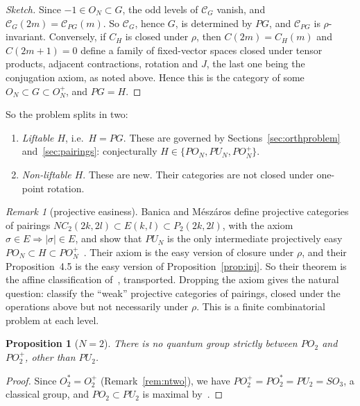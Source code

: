 \documentclass[11pt]{amsart}
\newtheorem{proposition}[theorem]{Proposition}
\theoremstyle{definition}
\theoremstyle{remark}
\newtheorem{remark}[theorem]{Remark}
\theoremstyle{plain}
\numberwithin{equation}{section}
\numberwithin{table}{section}
\begin{document}
\begin{proof}[Sketch]
Since $-1\in O_N\subset G$, the odd levels of $\mathcal C_G$ vanish, and $\mathcal C_G(2m)=\mathcal C_{PG}(m)$. So $\mathcal C_G$, hence $G$, is determined by
$PG$, and $\mathcal C_{PG}$ is $\rho$-invariant. Conversely, if $C_H$ is closed under $\rho$, then $C(2m)=C_H(m)$ and $C(2m+1)=0$
define a family of fixed-vector spaces closed under tensor products, adjacent contractions, rotation and $J$, the last
one being the conjugation axiom, as noted above. Hence this is the category of some $O_N\subset G\subset O_N^+$, and $PG=H$.
\end{proof}

So the problem splits in two:
\begin{enumerate}
\item \emph{Liftable $H$}, i.e.\ $H=PG$. These are governed by Sections~\ref{sec:orthproblem} and~\ref{sec:pairings}: conjecturally $H\in\{PO_N,PU_N,PO_N^+\}$.
\item \emph{Non-liftable $H$}. These are new. Their categories are not closed under one-point rotation.
\end{enumerate}

\begin{remark}[projective easiness]
Banica and M\'esz\'aros define projective categories of pairings $NC_2(2k,2l)\subset E(k,l)\subset P_2(2k,2l)$, with the
axiom $\sigma\in E\Rightarrow|\sigma|\in E$, and show that $PU_N$ is the only intermediate projectively easy
$PO_N\subset H\subset PO_N^+$~\cite[Theorem~4.6]{bme}. Their axiom is the easy version of closure under $\rho$, and their
Proposition~4.5 is the easy version of Proposition~\ref{prop:inj}. So their theorem is the affine classification of~\cite{bcs},
transported. Dropping the axiom gives the natural question: classify the ``weak'' projective categories of pairings,
closed under the operations above but not necessarily under $\rho$. This is a finite combinatorial problem at each level.
\end{remark}

\begin{proposition}[$N=2$]
There is no quantum group strictly between $PO_2$ and $PO_2^+$, other than $PU_2$.
\end{proposition}

\begin{proof}
Since $O_2^*=O_2^+$ (Remark~\ref{rem:ntwo}), we have $PO_2^+=PO_2^*=PU_2=SO_3$, a classical group, and $PO_2\subset PU_2$ is maximal
by~\cite{bbcc}.
\end{proof}
\end{document}
